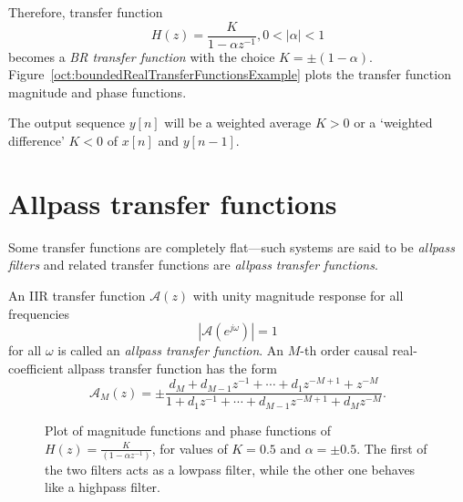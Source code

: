 \documentclass[\documentfontsize, twocolumn]{\classname}
\begin{document}
Therefore, transfer function
\[
    H(z) = \frac{
        K
    } {
        1 - \alpha z^{-1}
    },
    0 < |\alpha| < 1
\]
becomes a \emph{BR transfer function} with the choice $K = \pm(1 - \alpha)$. Figure~\ref{oct:boundedRealTransferFunctionsExample} plots the transfer function magnitude and phase functions.

The output sequence $y[n]$ will be a weighted average $K > 0$ or a `weighted difference' $K < 0$ of $x[n]$ and $y[n-1]$.

\section{Allpass transfer functions}\label{sec:allpassTransferFunctions}
Some transfer functions are completely flat---such systems are said to be \emph{allpass filters} and related transfer functions are \emph{allpass transfer functions}.

\begin{defin}
    An IIR transfer function $\mathcal A(z)$ with unity magnitude response for all frequencies
    \begin{equation}\label{eqn:allpassTransferFunction}
        \left|\mathcal A(e^{j\omega})\right| = 1
    \end{equation}
    for all $\omega$
    is called an \emph{allpass transfer function}. An $M$-th order causal real-coefficient allpass transfer function has the form
    \begin{equation}\label{eqn:allpassTransferFunctionM}
        \mathcal A_M(z) = \pm\frac {
            d_M + d_{M-1}z^{-1} + \cdots + d_1z^{-M+1} + z^{-M}
        } {
            1 + d_1z^{-1} + \cdots + d_{M-1}z^{-M+1} + d_Mz^{-M}
        }.
    \end{equation}
\end{defin}

\begin{figure*}[ht]
\begin{center}
\scalebox{0.45}{
    
}\caption{Plot of magnitude functions and phase functions of $H(z) = \frac{K}{(1 - \alpha z^{-1})}$, for values of $K=0.5$ and $\alpha=\pm 0.5$. The first of the two filters acts as a lowpass filter, while the other one behaves like a highpass filter.}\label{oct:allpassTransferFunctionMirrorExample}
\end{center}
\end{figure*}
\end{document}
